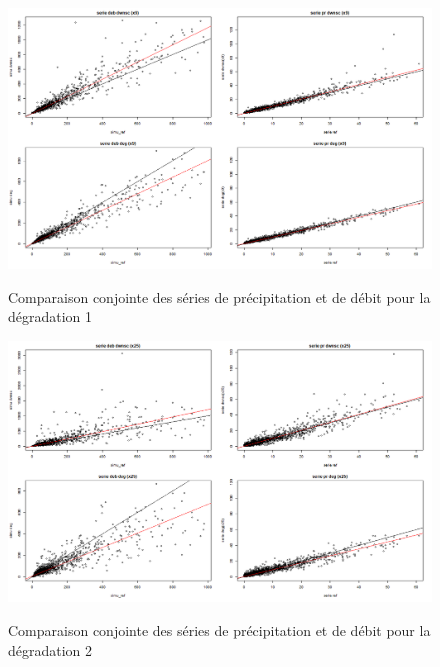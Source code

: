 \documentclass[a4paper,11pt]{article}
\numberwithin{equation}{section}
\begin{document}
\begin{figure}[H]
	\begin{center}
		\includegraphics[scale=0.35]{images/multi_comparaison_2.png}\\
	\end{center}
\caption{Comparaison conjointe des séries de précipitation et de débit pour la dégradation 1}
\end{figure}
\begin{figure}[H]
	\begin{center}
		\includegraphics[scale=0.35]{images/multi_comparaison_3.png}\\
	\end{center}
\caption{Comparaison conjointe des séries de précipitation et de débit pour la dégradation 2}
\end{figure} 
\end{document}
